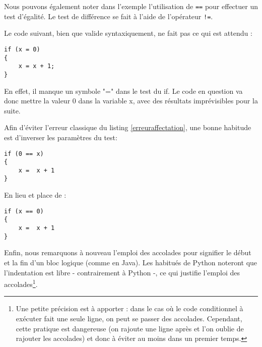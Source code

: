 Nous pouvons \'egalement noter dans l'exemple l'utilisation de \texttt{==} pour
effectuer un test d'\'egalit\'e. Le test de diff\'erence se fait \`a l'aide de
l'op\'erateur \verb+!=+.\\

\begin{warning}
Le code suivant, bien que valide syntaxiquement, ne fait pas ce qui est attendu :\\
\end{warning}

\begin{DDbox}{\linewidth}
\begin{lstlisting}[caption=Une erreur classique, label=erreuraffectation]
if (x = 0)
{
    x = x + 1;
}
\end{lstlisting}
\end{DDbox}

En effet, il manque un symbole "=" dans le test du if. Le code en question va donc mettre
la valeur 0 dans la variable x, avec des r\'esultats impr\'evisibles pour la suite.

\begin{habitudes}[Test]

Afin d'\'eviter l'erreur classique du listing \ref{erreuraffectation}, une bonne habitude est d'inverser les param\`etres du test:\\

\begin{DDbox}{\linewidth}
\begin{lstlisting}
if (0 == x)
{
	x =  x + 1
}
\end{lstlisting}
\end{DDbox}

En lieu et place de :\\

\begin{DDbox}{\linewidth}\begin{lstlisting}
if (x == 0)
{
	x =  x + 1
}
\end{lstlisting}
\end{DDbox}

\end{habitudes}

Enfin, nous remarquons \`a nouveau l'emploi des accolades pour signifier le
d\'ebut et la fin d'un bloc logique (comme en Java). Les habitu\'es de
Python noteront que l'indentation est libre - contrairement \`a Python -, ce
qui justifie l'emploi des accolades\footnote{Une petite pr\'ecision est \`a apporter : dans le cas o\`u le code conditionnel à ex\'ecuter fait une seule ligne, on peut se passer des accolades.  Cependant, cette pratique est dangereuse (on rajoute une ligne apr\`es et l'on oublie de rajouter les accolades) et donc \`a \'eviter au moins dans un premier temps.}.


